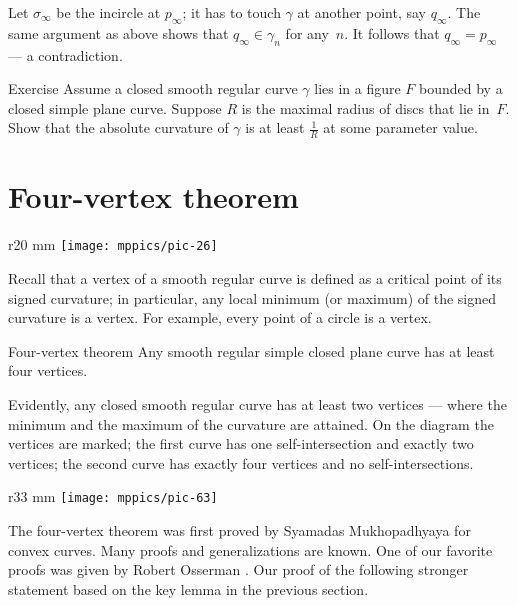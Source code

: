 Let $\sigma_\infty$ be the incircle at $p_\infty$; it has to touch $\gamma$ at another point, say $q_\infty$.
The same argument as above shows that $q_\infty\in\gamma_n$ for any~$n$.
It follows that $q_\infty =p_\infty$ --- a contradiction.
\qeds

\begin{thm}{Exercise}\label{ex:moon-rad}
Assume a closed smooth regular curve $\gamma$ lies in a figure $F$ bounded by a closed simple plane curve.
Suppose $R$ is the maximal radius of discs that lie in~$F$.
Show that the absolute curvature of $\gamma$ is at least $\tfrac1R$ at some parameter value.
\end{thm}

\section{Four-vertex theorem}
{

\begin{wrapfigure}{r}{20 mm}
\vskip-8mm
\centering
\texttt{[image: mppics/pic-26]}
\vskip0mm
\end{wrapfigure}

Recall that a vertex of a smooth regular curve is defined as a critical point of its signed curvature;
in particular, any local minimum (or maximum) of the signed curvature is a vertex.
For example, every point of a circle is a vertex.

\begin{thm}{Four-vertex theorem}\label{thm:4-vert}
Any smooth regular simple closed plane curve has at least four vertices.
\end{thm}

}

Evidently, any closed smooth regular curve has at least two vertices --- where the minimum and the maximum of the curvature are attained.
On the diagram the vertices are marked;
the first curve has one self-intersection and exactly two vertices;
the second curve has exactly four vertices and no self-intersections.

\begin{wrapfigure}{r}{33 mm}
\vskip-5mm
\centering
\texttt{[image: mppics/pic-63]}
\vskip0mm
\end{wrapfigure}

The four-vertex theorem was first proved by Syamadas Mukhopadhyaya \cite{mukhopadhyaya} for convex curves.
Many proofs and generalizations are known.
One of our favorite proofs was given by Robert Osserman \cite{osserman}.
Our proof of the following stronger statement based on the key lemma in the previous section.


